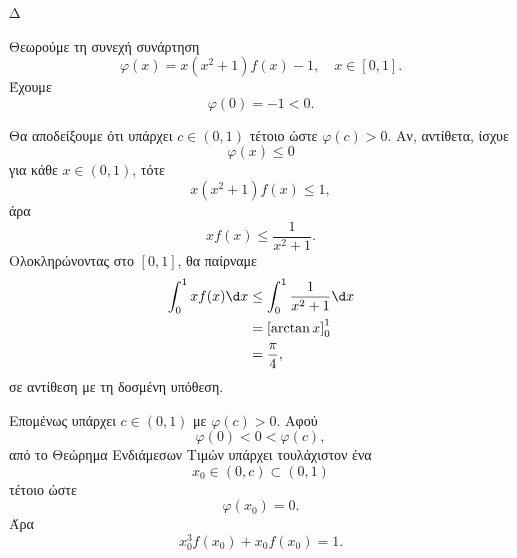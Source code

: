 \begin{thema}{Δ}
\begin{erwthma}
\item Θεωρούμε τη συνεχή συνάρτηση
\[
\varphi(x)=x(x^2+1)f(x)-1,\quad x\in[0,1].
\]
Έχουμε
\[
\varphi(0)=-1<0.
\]

Θα αποδείξουμε ότι υπάρχει $c\in(0,1)$ τέτοιο ώστε $\varphi(c)>0$. Αν, αντίθετα, ίσχυε
\[
\varphi(x)\leq0
\]
για κάθε $x\in(0,1)$, τότε
\[
x(x^2+1)f(x)\leq1,
\]
άρα
\[
xf(x)\leq\frac{1}{x^2+1}.
\]
Ολοκληρώνοντας στο $[0,1]$, θα παίρναμε
\begin{align*}
\int_0^1xf(x)\d x
&\leq\int_0^1\frac{1}{x^2+1}\d x\\
&=\left[\arctan x\right]_0^1\\
&=\frac{\pi}{4},
\end{align*}
σε αντίθεση με τη δοσμένη υπόθεση.

Επομένως υπάρχει $c\in(0,1)$ με $\varphi(c)>0$. Αφού
\[
\varphi(0)<0<\varphi(c),
\]
από το Θεώρημα Ενδιάμεσων Τιμών υπάρχει τουλάχιστον ένα
\[
x_0\in(0,c)\subset(0,1)
\]
τέτοιο ώστε
\[
\varphi(x_0)=0.
\]
Άρα
\[
{x_0^3f(x_0)+x_0f(x_0)=1}.
\]
\end{erwthma}
\end{thema}

